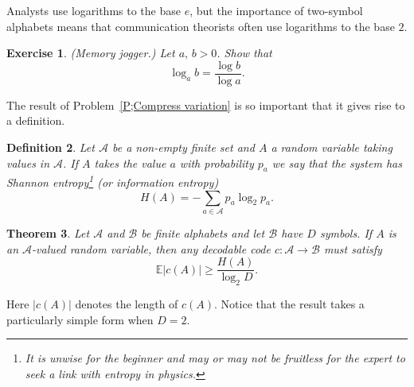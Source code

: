 \documentclass[12pt,a4paper]{article}
\theoremstyle{plain}
\newtheorem{theorem}{Theorem}[section]
\newtheorem{definition}[theorem]{Definition}
\newtheorem{exercise}[theorem]{Exercise}
\theoremstyle{definition}
\begin{document}
    Analysts use logarithms to the base $e$, but the importance
    of two-symbol alphabets means that communication theorists
    often use logarithms to the base $2$.
    \begin{exercise}
        \label{E;Memory}
        (Memory jogger.) Let $a,\,b>0$. Show that
        \[\log_{a} b=\frac{\log b}{\log a}.\]
    \end{exercise}
    The result of Problem~\ref{P;Compress variation}
    is so important that it gives rise to a definition.
    \begin{definition}
        \label{D;Shannon entropy}
        Let ${\mathcal A}$ be a
        non-empty finite set and $A$ a random variable taking
        values in ${\mathcal A}$. If $A$ takes the value $a$
        with probability $p_{a}$ we say that the system has
        \emph{Shannon entropy}\footnote{It is unwise for the beginner
        and may or may not be fruitless for the expert
        to seek a link with entropy in physics.}
        (or \emph{information entropy})
        \[H(A)=-\sum_{a\in {\mathcal A}}p_{a}\log_{2} p_{a}.\]
    \end{definition}
    \begin{theorem}
        \label{T;no better}
        Let ${\mathcal A}$ and ${\mathcal B}$
        be finite alphabets and let ${\mathcal B}$ have $D$ symbols. If
        $A$ is an ${\mathcal A}$-valued random variable,
        then any decodable code $c:{\mathcal A}\rightarrow{\mathcal B}$
        must satisfy
        \[{\mathbb E}|c(A)|\geq \frac{H(A)}{\log_{2} D}.\]
    \end{theorem}
    Here $|c(A)|$ denotes the length of $c(A)$.
    Notice that the result takes a particularly
    simple form when $D=2$.
\end{document}
